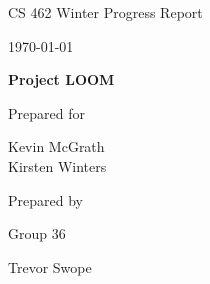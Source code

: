 \documentclass[onecolumn, draftclsnofoot,10pt, compsoc]{IEEEtran}
\def \CapstoneTeamName{     }
\def \CapstoneTeamNumber{       36}
\def \GroupMemberOne{           Trevor Swope}
\def \CapstoneProjectName{      Project LOOM}
\def \CapstoneSponsorPerson{    Chet Udell}
\def \DocType{  %
                Winter Progress Report
                }
\newcommand{\NameSigPair}[1]{\par
\makebox[2.75in][r]{#1} \hfil   \makebox[3.25in]{\makebox[2.25in]{\hrulefill} \hfill        \makebox[.75in]{\hrulefill}}
\par\vspace{-12pt} \textit{\tiny\noindent
\makebox[2.75in]{} \hfil        \makebox[3.25in]{\makebox[2.25in][r]{Signature} \hfill  \makebox[.75in][r]{Date}}}}
\begin{document}
\begin{titlepage}
    \begin{singlespace}
        \hfill 
        \par\vspace{.2in}
        \centering
        \scshape{
            \huge CS 462 \DocType \par
            {\large\today}\par
            \vspace{.5in}
            \textbf{\Huge\CapstoneProjectName}\par
            \vfill
            {\large Prepared for}\par
            \Huge Kevin McGrath \\ Kirsten Winters \par
            \vspace{5pt}
            {\large Prepared by }\par
            Group\CapstoneTeamNumber\par
            \CapstoneTeamName\par 
            \vspace{5pt}
            \GroupMemberOne \\
            \vspace{20pt}
        }
        \begin{abstract}
            This document details the progress made in Winter Term 2018 on Project LOOM by me (Trevor Swope), a member of CS Capstone Group 36. It goes over what I did this week and gives a brief retrospective of where we are in the project.
        \end{abstract}     
    \end{singlespace}
\end{titlepage}
\newpage
{}
\tableofcontents
\clearpage
\end{document}
